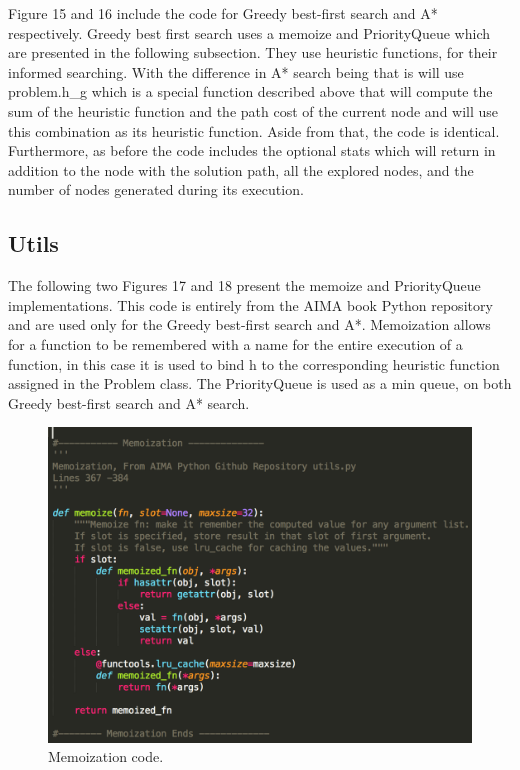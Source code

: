 \documentclass[12pt, letter]{article}
\begin{document}
Figure 15 and 16 include the code for Greedy best-first search and A* respectively. Greedy best first search uses a memoize and PriorityQueue which are presented in the following subsection. They use heuristic functions, for their informed searching. With the difference in A* search being that is will use problem.h\_g which is a special function described above that will compute the sum of the heuristic function and the path cost of the current node and will use this combination as its heuristic function. Aside from that, the code is identical. Furthermore, as before the code includes the optional stats which will return in addition to the node with the solution path, all the explored nodes, and the number of nodes generated during its execution. 

\FloatBarrier

\subsection{Utils}

The following two Figures 17 and 18 present the memoize and PriorityQueue implementations. This code is entirely from the AIMA book Python repository and are used only for the Greedy best-first search and A*. Memoization allows for a function to be remembered with a name for the entire execution of a function, in this case it is used to bind h to the corresponding heuristic function assigned in the Problem class. The PriorityQueue is used as a min queue, on both Greedy best-first search and A* search. 

\begin{figure}[htb]
  \centering
  \includegraphics[width=0.9 \textwidth]{./graphs/memoization.png}
  \caption{Memoization code.}
\end{figure}
\end{document}
